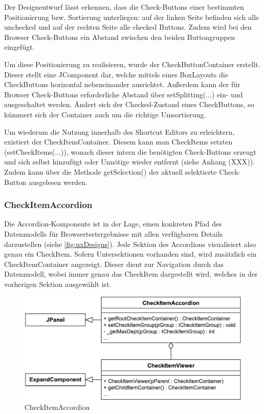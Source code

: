 Der Designentwurf lässt erkennen, dass die Check-Buttons einer bestimmten Positionierung bzw. Sortierung unterliegen: auf der linken Seite befinden sich alle unchecked und auf der rechten Seite alle checked Buttons. Zudem wird bei den Browser Check-Buttons ein Abstand zwischen den beiden Buttongruppen eingefügt. 

Um diese Positionierung zu realisieren, wurde der CheckButtonContainer erstellt. Dieser stellt eine JComponent dar, welche mittels eines BoxLayouts die CheckButtons horizontal nebeneinander ausrichtet. Außerdem kann der für Browser Check-Buttons erforderliche Abstand über setSplitting(...) ein- und ausgeschaltet werden. Ändert sich der Checked-Zustand eines CheckButtons, so kümmert sich der Container auch um die richtige Umsortierung.

Um wiederum die Nutzung innerhalb des Shortcut Editors zu erleichtern, existiert der CheckItemContainer. Diesem kann man CheckItems setzten (setCheckItems(...)), wonach dieser intern die benötigten Check-Buttons erzeugt und sich selbst hinzufügt oder Unnötige wieder entfernt (siehe Anhang (XXX)). Zudem kann über die Methode getSelection() der aktuell selektierte Check-Button ausgelesen werden.
\newpage

\subsubsection{CheckItemAccordion}

Die Accordion-Komponente ist in der Lage, einen konkreten Pfad des Datenmodells für Browsertestergebnisse mit allen verfügbaren Details darzustellen (siehe \autoref{fig:uxDesigns}).
Jede Sektion des Accordions visualisiert also genau ein CheckItem. Sofern Untersektionen vorhanden sind, wird zusätzlich ein CheckItemContainer angezeigt. Dieser dient zur Navigation durch das Datenmodell, wobei immer genau das CheckItem dargestellt wird, welches in der vorherigen Sektion ausgewählt ist.

\begin{figure}
	\vspace{-12px}
	\centering
	\includegraphics[width=0.95\linewidth]{../graphic/diagrams/CD_CheckItemAccordion/CheckItemAccordion}
	\caption{CheckItemAccordion}
	\label{fig:checkitemaccordion}
\end{figure}


